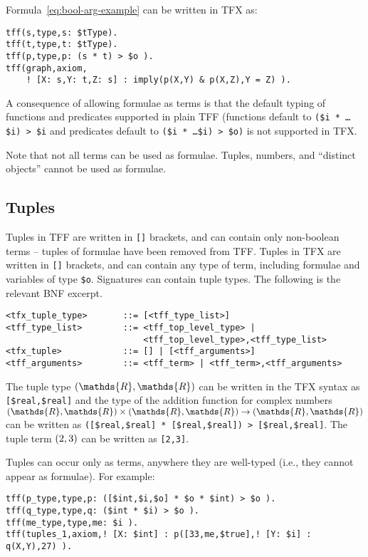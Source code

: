 \documentclass{easychair}
\begin{document}

Formula~\ref{eq:bool-arg-example} can be written in TFX as:
\begin{verbatim}
tff(s,type,s: $tType).
tff(t,type,t: $tType).
tff(p,type,p: (s * t) > $o ).
tff(graph,axiom,
    ! [X: s,Y: t,Z: s] : imply(p(X,Y) & p(X,Z),Y = Z) ).
\end{verbatim}

A consequence of allowing formulae as terms is that the default typing of 
functions and predicates supported in plain TFF (functions default to 
{\tt (\$i * \ldots * \$i) > \$i} and predicates default to 
{\tt (\$i * \ldots * \$i) > \$o)} is not supported in TFX.

Note that not all terms can be used as formulae.
Tuples, numbers, and ``distinct objects'' cannot be used as formulae.

\subsection{Tuples}

Tuples in TFF are written in {\tt []} brackets, and can contain only
non-boolean terms -- tuples of formulae have been removed from TFF. 
Tuples in TFX are written in {\tt []} brackets, and can contain any type of 
term, including formulae and variables of type {\tt \$o}. 
Signatures can contain tuple types. 
The following is the relevant BNF excerpt.
\begin{verbatim}
<tfx_tuple_type>       ::= [<tff_type_list>]
<tff_type_list>        ::= <tff_top_level_type> |
                           <tff_top_level_type>,<tff_type_list>
<tfx_tuple>            ::= [] | [<tff_arguments>]
<tff_arguments>        ::= <tff_term> | <tff_term>,<tff_arguments>
\end{verbatim}

The tuple type $\tuple{\mathds{R},\mathds{R}}$ can be written in the TFX syntax as \verb|[$real,$real]| and the type of the addition function for complex numbers $\tuple{\mathds{R},\mathds{R}} \times \tuple{\mathds{R},\mathds{R}} \to \tuple{\mathds{R},\mathds{R}}$ can be written as
\verb'([$real,$real] * [$real,$real]) > [$real,$real]'. 
The tuple term $({2,3})$ can be written as \verb'[2,3]'.

Tuples can occur only as terms, anywhere they are well-typed (i.e., they
cannot appear as formulae). 
For example:
\begin{verbatim}
tff(p_type,type,p: ([$int,$i,$o] * $o * $int) > $o ).
tff(q_type,type,q: ($int * $i) > $o ).
tff(me_type,type,me: $i ).
tff(tuples_1,axiom,! [X: $int] : p([33,me,$true],! [Y: $i] : q(X,Y),27) ).
\end{verbatim}
\end{document}
